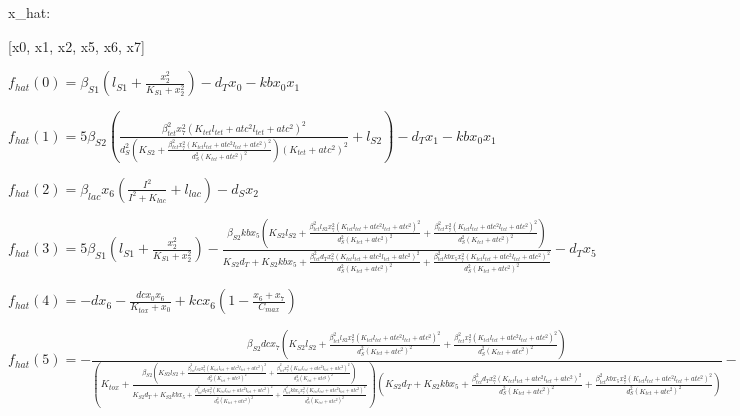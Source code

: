 x_{hat}: 

[x0, x1, x2, x5, x6, x7]


$f_{hat}(0)=\beta_{S1} \left(l_{S1} + \frac{x_{2}^{2}}{K_{S1} + x_{2}^{2}}\right) - d_{T} x_{0} - kb x_{0} x_{1}$


$f_{hat}(1)=5 \beta_{S2} \left(\frac{\beta_{tet}^{2} x_{7}^{2} \left(K_{tet} l_{tet} + atc^{2} l_{tet} + atc^{2}\right)^{2}}{d_{S}^{2} \left(K_{S2} + \frac{\beta_{tet}^{2} x_{7}^{2} \left(K_{tet} l_{tet} + atc^{2} l_{tet} + atc^{2}\right)^{2}}{d_{S}^{2} \left(K_{tet} + atc^{2}\right)^{2}}\right) \left(K_{tet} + atc^{2}\right)^{2}} + l_{S2}\right) - d_{T} x_{1} - kb x_{0} x_{1}$


$f_{hat}(2)=\beta_{lac} x_{6} \left(\frac{I^{2}}{I^{2} + K_{lac}} + l_{lac}\right) - d_{S} x_{2}$


$f_{hat}(3)=5 \beta_{S1} \left(l_{S1} + \frac{x_{2}^{2}}{K_{S1} + x_{2}^{2}}\right) - \frac{\beta_{S2} kb x_{5} \left(K_{S2} l_{S2} + \frac{\beta_{tet}^{2} l_{S2} x_{7}^{2} \left(K_{tet} l_{tet} + atc^{2} l_{tet} + atc^{2}\right)^{2}}{d_{S}^{2} \left(K_{tet} + atc^{2}\right)^{2}} + \frac{\beta_{tet}^{2} x_{7}^{2} \left(K_{tet} l_{tet} + atc^{2} l_{tet} + atc^{2}\right)^{2}}{d_{S}^{2} \left(K_{tet} + atc^{2}\right)^{2}}\right)}{K_{S2} d_{T} + K_{S2} kb x_{5} + \frac{\beta_{tet}^{2} d_{T} x_{7}^{2} \left(K_{tet} l_{tet} + atc^{2} l_{tet} + atc^{2}\right)^{2}}{d_{S}^{2} \left(K_{tet} + atc^{2}\right)^{2}} + \frac{\beta_{tet}^{2} kb x_{5} x_{7}^{2} \left(K_{tet} l_{tet} + atc^{2} l_{tet} + atc^{2}\right)^{2}}{d_{S}^{2} \left(K_{tet} + atc^{2}\right)^{2}}} - d_{T} x_{5}$


$f_{hat}(4)=- d x_{6} - \frac{dc x_{0} x_{6}}{K_{tox} + x_{0}} + kc x_{6} \left(1 - \frac{x_{6} + x_{7}}{C_{max}}\right)$


$f_{hat}(5)=- \frac{\beta_{S2} dc x_{7} \left(K_{S2} l_{S2} + \frac{\beta_{tet}^{2} l_{S2} x_{7}^{2} \left(K_{tet} l_{tet} + atc^{2} l_{tet} + atc^{2}\right)^{2}}{d_{S}^{2} \left(K_{tet} + atc^{2}\right)^{2}} + \frac{\beta_{tet}^{2} x_{7}^{2} \left(K_{tet} l_{tet} + atc^{2} l_{tet} + atc^{2}\right)^{2}}{d_{S}^{2} \left(K_{tet} + atc^{2}\right)^{2}}\right)}{\left(K_{tox} + \frac{\beta_{S2} \left(K_{S2} l_{S2} + \frac{\beta_{tet}^{2} l_{S2} x_{7}^{2} \left(K_{tet} l_{tet} + atc^{2} l_{tet} + atc^{2}\right)^{2}}{d_{S}^{2} \left(K_{tet} + atc^{2}\right)^{2}} + \frac{\beta_{tet}^{2} x_{7}^{2} \left(K_{tet} l_{tet} + atc^{2} l_{tet} + atc^{2}\right)^{2}}{d_{S}^{2} \left(K_{tet} + atc^{2}\right)^{2}}\right)}{K_{S2} d_{T} + K_{S2} kb x_{5} + \frac{\beta_{tet}^{2} d_{T} x_{7}^{2} \left(K_{tet} l_{tet} + atc^{2} l_{tet} + atc^{2}\right)^{2}}{d_{S}^{2} \left(K_{tet} + atc^{2}\right)^{2}} + \frac{\beta_{tet}^{2} kb x_{5} x_{7}^{2} \left(K_{tet} l_{tet} + atc^{2} l_{tet} + atc^{2}\right)^{2}}{d_{S}^{2} \left(K_{tet} + atc^{2}\right)^{2}}}\right) \left(K_{S2} d_{T} + K_{S2} kb x_{5} + \frac{\beta_{tet}^{2} d_{T} x_{7}^{2} \left(K_{tet} l_{tet} + atc^{2} l_{tet} + atc^{2}\right)^{2}}{d_{S}^{2} \left(K_{tet} + atc^{2}\right)^{2}} + \frac{\beta_{tet}^{2} kb x_{5} x_{7}^{2} \left(K_{tet} l_{tet} + atc^{2} l_{tet} + atc^{2}\right)^{2}}{d_{S}^{2} \left(K_{tet} + atc^{2}\right)^{2}}\right)} - d x_{7} + kc x_{7} \left(1 - \frac{x_{6} + x_{7}}{C_{max}}\right)$



